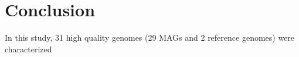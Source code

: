 \section*{Conclusion}

In this study, 31 high quality genomes (29 MAGs and 2 reference genomes) were characterized


